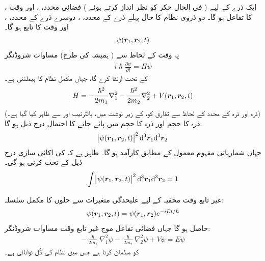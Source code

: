 ایک ذرے کے لیے ( فی الحال چکر کو نظر انداز کرتے ہوئے )  فضائی محدد، ، اور وقت ، کا تفاعل ہو گا۔ دو ذروی نظام کا حال پہلے ذرے کے محدد، ، دوسرے ذرے کے محدد، ، اور وقت کا تابع ہو گا۔ 
\begin{align} 
\psi ( {{\boldsymbol{r}}}_1 , {{\boldsymbol{r}}}_2 , t ) 
\end{align}
 یہ وقت کے لحاظ سے ( ہمیشہ کی طرح) مساوات شروڈنگر 
\begin{align}
i \hslash \frac{ \partial \psi }{ \partial t } = H \psi
\end{align}
کے تحت ارتقا کرے گا، جہاں  مکمل نظام کا ہیملٹنی ہے۔
\begin{equation}
H = - \frac{ \hslash^2 }{ 2 m_1 } \nabla_1^2 - \frac{ \hslash^2 }{ 2 m_2 } \nabla_2^2 + V({{\boldsymbol{r}}}_1 , {{\boldsymbol{r}}}_2 , t )
\end{equation}
(ذرہ  اور ذرہ  کے محدد کے لحاظ سے تفارق کو،  کے زیر نوشت میں، بالترتیب  اور  سے ظاہر کیا گیا ہے۔) ذرہ  کا
 حجم  اور ذرہ  کا حجم  میں پائے جانے کا احتمال درج ذیل ہو گا:
\begin{align}
\abs{\psi (\kvec{r}_1 , \kvec{r}_2 , t ) }^2 {\dif^{\,3} } { \kvec{r}_1 } {\dif^{\,3} } { \kvec{r}_2 }
\end{align}
جہاں شماریاتی مفہوم معمول کے مطابق کارآمد ہو گا۔ ظاہر ہے کہ  کی اکائی سازی درج ذیل کے تحت کرنی ہو گی۔ 
\begin{align}
\int \abs{\psi ( \kvec{r}_1 , \kvec{r}_2 , t ) }^2 {\dif^{\,3} } {\kvec{r}_1 } {\dif^{\,3} } { \kvec{r}_2 } = 1
\end{align}

غیر تابع وقت مخفیہ کے لیے علیحدگی متغیرات سے حلوں کا مکمل سلسلہ:
\begin{align}
\psi ( {{\boldsymbol{r}}}_1 , {{\boldsymbol{r}}}_2 , t ) = \psi ( {{\boldsymbol{r}}}_1 , {{\boldsymbol{r}}}_2 ) {e}^{-i E t/\hslash} 
\end{align}
حاصل ہو گا جہاں فضائی تفاعل موج  غیر تابع وقت مساوات شروڈنگر:
\begin{align}
-\frac{ \hslash }{ 2 m_1 } {\nabla_1^2} { \psi } - \frac{ \hslash }{ 2 m_2 } \nabla_2^2 { \psi } + V \psi =E\psi
\end{align}
کو مطمئن کرتا ہے جس میں  نظام کی کُل توانائی ہے۔ 

